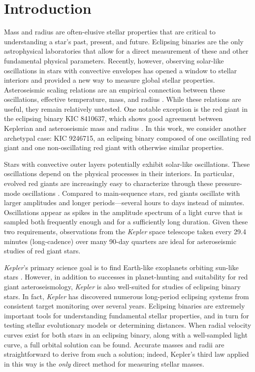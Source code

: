 \section{Introduction}\label{intro}

Mass and radius are often-elusive stellar properties that are critical to understanding a star's past, present, and future. Eclipsing binaries are the only astrophysical laboratories that allow for a direct measurement of these and other fundamental physical parameters. Recently, however, observing solar-like oscillations in stars with convective envelopes has opened a window to stellar interiors and provided a new way to measure global stellar properties. Asteroseismic scaling relations are an empirical connection between these oscillations, effective temperature, mass, and radius \citep{kje95,hub10,mos13}. While these relations are useful, they remain relatively untested. One notable exception is the red giant in the eclipsing binary KIC 8410637, which shows good agreement between Keplerian and asteroseismic mass and radius \citep{fra13}. In this work, we consider another archetypal case: KIC 9246715, an eclipsing binary composed of one oscillating red giant and one non-oscillating red giant with otherwise similar properties.

Stars with convective outer layers potentially exhibit solar-like oscillations. These oscillations depend on the physical processes in their interiors. In particular, evolved red giants are increasingly easy to characterize through these pressure-mode oscillations \citep[for a review of this topic, see][]{cha13}. Compared to main-sequence stars, red giants oscillate with larger amplitudes and longer periods---several hours to days instead of minutes. Oscillations appear as spikes in the amplitude spectrum of a light curve that is sampled both frequently enough and for a sufficiently long duration. Given these two requirements, observations from the \emph{Kepler} space telescope taken every 29.4 minutes (long-cadence) over many 90-day quarters are ideal for asteroseismic studies of red giant stars.

\emph{Kepler}'s primary science goal is to find Earth-like exoplanets orbiting sun-like stars \citep{bor10}. However, in addition to successes in planet-hunting and suitability for red giant asteroseismology, \emph{Kepler} is also well-suited for studies of eclipsing binary stars. In fact, \emph{Kepler} has discovered numerous long-period eclipsing systems from consistent target monitoring over several years. Eclipsing binaries are extremely important tools for understanding fundamental stellar properties, and in turn for testing stellar evolutionary models or determining distances. When radial velocity curves exist for both stars in an eclipsing binary, along with a well-sampled light curve, a full orbital solution can be found. Accurate masses and radii are straightforward to derive from such a solution; indeed, Kepler's third law applied in this way is the \emph{only} direct method for measuring stellar masses.

